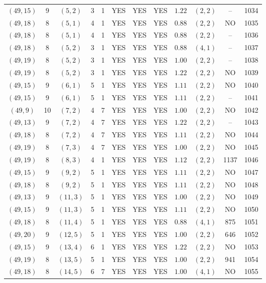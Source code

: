 \begin{longtable}{|c|c|c|c|c|c|c|c|c|c|c|c|}
$(49,15)$ & 9 & $(5,2)$ & 3 & 1 & YES & YES & YES & $1.22$ & $(2,2)$ & -- & 1034\\
$(49,18)$ & 8 & $(5,1)$ & 4 & 1 & YES & YES & YES & $0.88$ & $(2,2)$ & NO & 1035\\
$(49,18)$ & 8 & $(5,1)$ & 4 & 1 & YES & YES & YES & $0.88$ & $(2,2)$ & -- & 1036\\
$(49,18)$ & 8 & $(5,2)$ & 3 & 1 & YES & YES & YES & $0.88$ & $(4,1)$ & -- & 1037\\
$(49,19)$ & 8 & $(5,2)$ & 3 & 1 & YES & YES & YES & $1.00$ & $(2,2)$ & -- & 1038\\
$(49,19)$ & 8 & $(5,2)$ & 3 & 1 & YES & YES & YES & $1.22$ & $(2,2)$ & NO & 1039\\
$(49,15)$ & 9 & $(6,1)$ & 5 & 1 & YES & YES & YES & $1.11$ & $(2,2)$ & NO & 1040\\
$(49,15)$ & 9 & $(6,1)$ & 5 & 1 & YES & YES & YES & $1.11$ & $(2,2)$ & -- & 1041\\
$(49,9)$ & 10 & $(7,2)$ & 4 & 7 & YES & YES & YES & $1.00$ & $(2,2)$ & NO & 1042\\
$(49,13)$ & 9 & $(7,2)$ & 4 & 7 & YES & YES & YES & $1.22$ & $(2,2)$ & -- & 1043\\
$(49,18)$ & 8 & $(7,2)$ & 4 & 7 & YES & YES & YES & $1.11$ & $(2,2)$ & NO & 1044\\
$(49,19)$ & 8 & $(7,3)$ & 4 & 7 & YES & YES & YES & $1.00$ & $(2,2)$ & NO & 1045\\
$(49,19)$ & 8 & $(8,3)$ & 4 & 1 & YES & YES & YES & $1.12$ & $(2,2)$ & 1137 & 1046\\
$(49,15)$ & 9 & $(9,2)$ & 5 & 1 & YES & YES & YES & $1.11$ & $(2,2)$ & NO & 1047\\
$(49,18)$ & 8 & $(9,2)$ & 5 & 1 & YES & YES & YES & $1.11$ & $(2,2)$ & NO & 1048\\
$(49,13)$ & 9 & $(11,3)$ & 5 & 1 & YES & YES & YES & $1.00$ & $(2,2)$ & NO & 1049\\
$(49,15)$ & 9 & $(11,3)$ & 5 & 1 & YES & YES & YES & $1.11$ & $(2,2)$ & NO & 1050\\
$(49,18)$ & 8 & $(11,4)$ & 5 & 1 & YES & YES & YES & $0.88$ & $(4,1)$ & 875 & 1051\\
$(49,20)$ & 9 & $(12,5)$ & 5 & 1 & YES & YES & YES & $1.00$ & $(2,2)$ & 646 & 1052\\
$(49,15)$ & 9 & $(13,4)$ & 6 & 1 & YES & YES & YES & $1.22$ & $(2,2)$ & NO & 1053\\
$(49,19)$ & 8 & $(13,5)$ & 5 & 1 & YES & YES & YES & $1.00$ & $(2,2)$ & 941 & 1054\\
$(49,18)$ & 8 & $(14,5)$ & 6 & 7 & YES & YES & YES & $1.00$ & $(4,1)$ & NO & 1055\\

\end{longtable}
